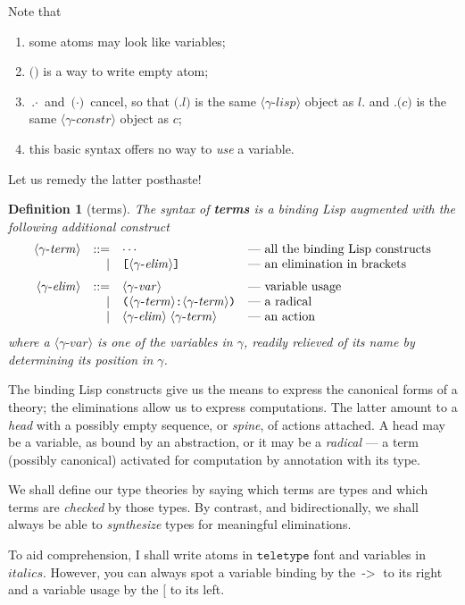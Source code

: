 \documentclass{jfp1}
\newtheorem{definition}[theorem]{Definition}
\newcommand{\A}{\texttt}
\newcommand{\V}{\mathit}
\newcommand{\ab}{\,\texttt{->}\;}
\newcommand{\Pa}[1]{\texttt{(}#1\texttt{)}}
\newcommand{\Bk}[1]{\texttt{[}#1\texttt{]}}
\newcommand{\D}{\texttt{.}}
\newcommand{\GS}[2]{\langle#1\textrm{-}\mathit{#2}\rangle}
\newcommand{\hb}{\texttt{:}}
\newcommand{\ra}[2]{\Pa{#1 \hb #2}}
\begin{document}
Note that
\begin{enumerate}
\item some atoms may look like variables;
\item $\Pa{}$ is a way to write empty atom;
\item $\D\cdot$ and $\Pa\cdot$ cancel, so that $\Pa{\D l}$ is the same $\GS\gamma{lisp}$ object as $l$. and $\D\Pa c$ is the same $\GS\gamma{constr}$ object as $c$;
\item this basic syntax offers no way to \emph{use} a variable.
\end{enumerate}

Let us remedy the latter posthaste!

\begin{definition}[terms]
  The syntax of \textbf{terms} is a binding Lisp augmented with the following additional construct
  \[\begin{array}{rrll}
      \GS\gamma{term} & ::= & \cdots & \mbox{--- all the binding Lisp constructs} \\
                &   | & \Bk{\GS\gamma{elim}} & \mbox{--- an elimination in brackets} \medskip\\
      \GS\gamma{elim} & ::= & \GS\gamma{var} & \mbox{--- variable usage} \\
                &   | & \ra{\GS\gamma{term}}{\GS\gamma{term}} & \mbox{--- a radical} \\
                &   | & \GS\gamma{elim}\; \GS\gamma{term} & \mbox{--- an action} \\
    \end{array}\]
where a $\GS\gamma{var}$ is one of the variables in $\gamma$, readily relieved of its name by determining its position in $\gamma$.
\end{definition}

The binding Lisp constructs give us the means to express the canonical forms of a theory; the eliminations allow us to express computations. The latter amount to a \emph{head} with a possibly empty sequence, or \emph{spine}, of actions attached. A head may be a variable, as bound by an abstraction, or it may be a \emph{radical} --- a term (possibly canonical) activated for computation by annotation with its type.

We shall define our type theories by saying which terms are types and which terms are \emph{checked} by those types. By contrast, and bidirectionally, we shall always be able to \emph{synthesize} types for meaningful eliminations.

To aid comprehension, I shall write atoms in $\A{teletype}$ font and variables in $\V{italics}$. However, you can always spot a variable binding by the $\ab$ to its right and a variable usage by the $\texttt{[}$ to its left.
\end{document}
